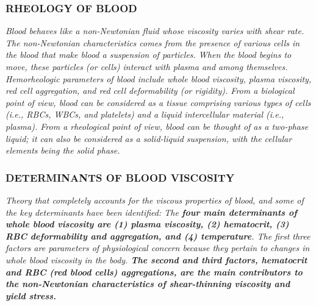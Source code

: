 \documentclass[11pt,letterpaper]{article}
\begin{document}
\subsubsection*{RHEOLOGY OF BLOOD}

\textit{Blood behaves like a non-Newtonian fluid whose viscosity varies with shear rate. The non-Newtonian characteristics comes from the presence of various cells in the blood that make blood a suspension of particles. When the blood begins to move, these particles (or cells) interact with plasma and among themselves. Hemorheologic parameters of blood include whole blood viscosity, plasma viscosity, red cell aggregation, and red cell deformability (or rigidity). From a biological point of view, blood can be considered as a tissue comprising various types of cells (i.e., RBCs, WBCs, and platelets) and a liquid intercellular material (i.e., plasma). From a rheological point of view, blood can be thought of as a two-phase liquid; it can also be considered as a solid-liquid suspension, with the cellular elements being the solid phase.}

\subsubsection*{DETERMINANTS OF BLOOD VISCOSITY }
\textit{Theory that completely accounts for
the viscous properties of blood, and some of the key determinants have been identified: The \textbf{four main determinants of whole blood viscosity are (1) plasma viscosity, (2) hematocrit, (3) RBC deformability and aggregation, and (4) temperature}. The first three factors are parameters of physiological concern because they pertain to changes in whole blood viscosity in the body. {\color{blue}\textbf{The second and third factors, hematocrit and RBC (red blood cells) aggregations, are the main contributors to the non-Newtonian characteristics of shear-thinning viscosity and yield stress.}}}
\end{document}
